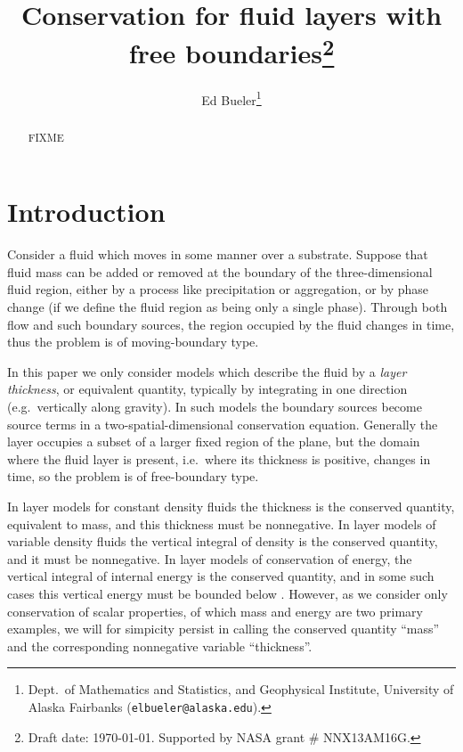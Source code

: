 \documentclass[final,leqno,onefignum,onetabnum]{siamltex1213bueler}
\title{Conservation for fluid layers with free boundaries\thanks{Draft date: \today.  Supported by NASA grant \# NNX13AM16G.}}
\author{Ed Bueler\thanks{Dept.~of Mathematics and Statistics, and Geophysical Institute, University of Alaska Fairbanks (\texttt{elbueler@alaska.edu}).}}
\begin{document}
\maketitle
{}%

\begin{abstract}
FIXME
\end{abstract}




\pagestyle{myheadings}
\thispagestyle{plain}


\section{Introduction}  \label{sec:intro}

Consider a fluid which moves in some manner over a substrate.  Suppose that fluid mass can be added or removed at the boundary of the three-dimensional fluid region, either by a process like precipitation or aggregation, or by phase change (if we define the fluid region as being only a single phase).  Through both flow and such boundary sources, the region occupied by the fluid changes in time, thus the problem is of moving-boundary type.

In this paper we only consider models which describe the fluid by a \emph{layer thickness}, or equivalent quantity, typically by integrating in one direction (e.g.~vertically along gravity).  In such models the boundary sources become source terms in a two-spatial-dimensional conservation equation.  Generally the layer occupies a subset of a larger fixed region of the plane, but the domain where the fluid layer is present, i.e.~where its thickness is positive, changes in time, so the problem is of free-boundary type.

In layer models for constant density fluids the thickness is the conserved quantity, equivalent to mass, and this thickness must be nonnegative.  In layer models of variable density fluids the vertical integral of density is the conserved quantity, and it must be nonnegative.  In layer models of conservation of energy, the vertical integral of internal energy is the conserved quantity, and in some such cases this vertical energy must be bounded below \cite{AschwandenBuelerKhroulevBlatter}.  However, as we consider only conservation of scalar properties, of which mass and energy are two primary examples, we will for simpicity persist in calling the conserved quantity ``mass'' and the corresponding nonnegative variable ``thickness''.
\end{document}
